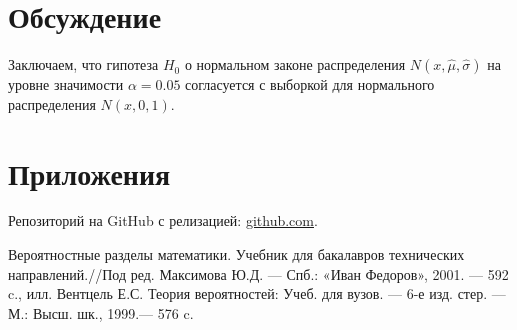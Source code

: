 \documentclass[12pt,a4paper]{scrartcl}
\begin{document}
\section{Обсуждение}
Заключаем, что гипотеза $H_{0}$ о нормальном законе распределения $N(x,\hat{\mu}, \hat{\sigma})$ на уровне значимости $\alpha = 0.05$ согласуется с выборкой для нормального распределения $N(x, 0, 1)$.

\section{Приложения}
Репозиторий на GitHub с релизацией: \href{https://github.com/WiillyWonka/MatStat}{github.com}.

\begin{thebibliography}{99}
		    Вероятностные разделы математики. Учебник для бакалавров технических направлений.//Под ред. Максимова Ю.Д. — Спб.: «Иван Федоров», 2001. — 592 c., илл.
		   Вентцель Е.С. Теория вероятностей: Учеб. для вузов. — 6-е изд. стер. — М.: Высш. шк., 1999.— 576 c.
\end{thebibliography}
\end{document}
